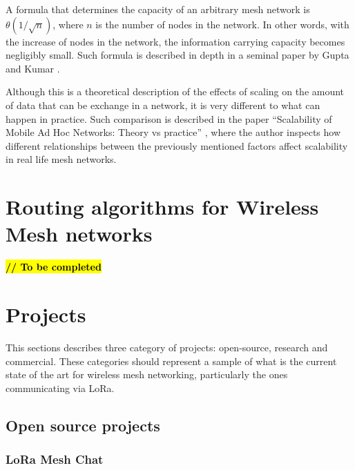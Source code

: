 			A formula that determines the capacity of an arbitrary mesh network is~$\theta(1/\sqrt{n})$, where $ n $ is the number of nodes in the network.
			In other words, with the increase of nodes in the network, the information carrying capacity becomes negligibly small.
			Such formula is described in depth in a seminal paper by Gupta and Kumar \cite{825799}.
			
			Although this is a theoretical description of the effects of scaling on the amount of data that can be exchange in a network, it is very different to what can happen in practice.
			Such comparison is described in the paper ``Scalability of Mobile Ad Hoc Networks: Theory vs practice''  \cite{5680385}, where the author inspects how different relationships between the previously mentioned factors affect scalability in real life mesh networks.
	
	\section{Routing algorithms for Wireless Mesh networks}
	
		\textbf{\textcolor{red}{\hl{// To be completed}}}
		
	
	
	\section{Projects}\label{sec:chap4_projects}
		
		This sections describes three category of projects: open-source, research and commercial.
		These categories should represent a sample of what is the current state of the art for wireless mesh networking, particularly the ones communicating via LoRa.
		
		\subsection{Open source projects}
		
			\subsubsection{LoRa Mesh Chat}\label{subsubsec:lorameshchat}


